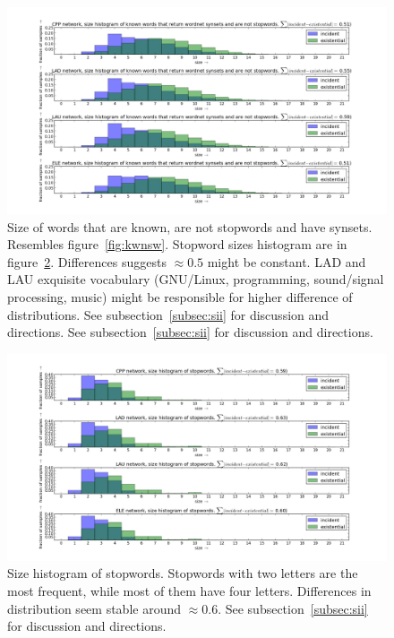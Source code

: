 \documentclass[%
 aip,
 jmp,%
 amsmath,amssymb,
 reprint,%
]{revtex4-1}
\begin{document}
\begin{figure}[h!]
    \centering
    \includegraphics[width=\textwidth]{figs/kwssnsw}
    \caption{Size of words that are known, are not stopwords and have synsets. Resembles figure~\ref{fig:kwnsw}. Stopword sizes histogram are in figure~\ref{fig:sw}. Differences suggests $\approx 0.5$ might be constant. LAD and LAU exquisite vocabulary (GNU/Linux, programming, sound/signal processing, music) might be responsible for higher difference of distributions. See subsection~\ref{subsec:sii} for discussion and directions. See subsection~\ref{subsec:sii} for discussion and directions.}
    \label{fig:kwssnsw}
\end{figure}


\begin{figure}[h!]
    \centering
    \includegraphics[width=\textwidth]{figs/sw}
    \caption{Size histogram of stopwords. Stopwords with two letters are the most frequent, while most of them have four letters. Differences in distribution seem stable around $\approx 0.6$. See subsection~\ref{subsec:sii} for discussion and directions.}
    \label{fig:sw}
\end{figure}
\end{document}
